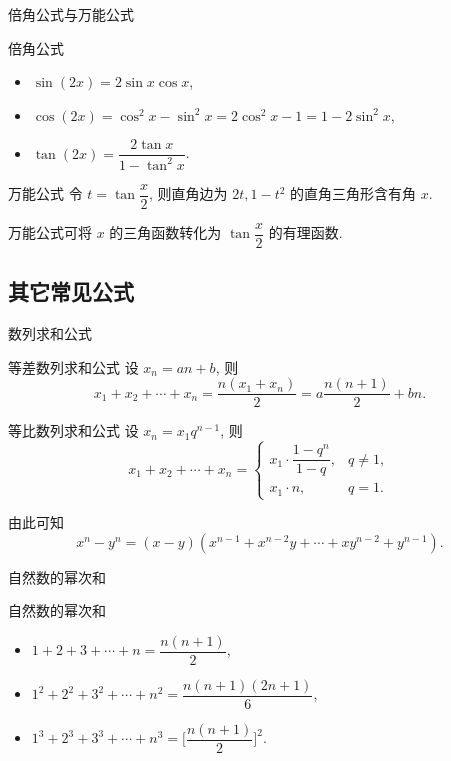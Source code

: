 \begin{frame}{倍角公式与万能公式}
	\onslide<+->
	\begin{main}{倍角公式}
		\begin{itemize}
			\item $\sin(2x)=2\sin x\cos x$,
			\item $\cos(2x)=\cos^2x-\sin^2x=2\cos^2x-1=1-2\sin^2x$,
			\item $\tan(2x)=\dfrac{2\tan x}{1-\tan^2x}$.
		\end{itemize}
	\end{main}
	\onslide<+->
	\begin{main}{万能公式}
		令 $t=\tan\dfrac x2$, 则直角边为 $2t,1-t^2$ 的直角三角形含有角 $x$.
		\onslide<+->{由于斜边是 $1+t^2$, 因此
		\[\sin x=\frac{2t}{1+t^2},\quad
			\cos x=\frac{1-t^2}{1+t^2},\quad
			\tan x=\frac{2t}{1-t^2}.\]}
	\end{main}
	\onslide<+->
	万能公式可将 $x$ 的三角函数转化为 $\tan \dfrac x2$ 的有理函数.
\end{frame}

\subsection{其它常见公式}

\begin{frame}{数列求和公式}
	\onslide<+->
	\begin{main}{等差数列求和公式}
		设 $x_n=an+b$, 则
		\[x_1+x_2+\cdots+x_n=\frac{n(x_1+x_n)}2=a\frac{n(n+1)}2+bn.\]
	\end{main}
	\onslide<+->
	\begin{main}{等比数列求和公式}
		设 $x_n=x_1 q^{n-1}$, 则
		\[x_1+x_2+\cdots+x_n=\begin{cases}
			x_1\cdot\dfrac{1-q^n}{1-q},& q\neq 1,\\
			x_1\cdot n, & q=1.
		\end{cases}\]
	\end{main}
	\onslide<+->
	由此可知
	\[x^n-y^n=(x-y)(x^{n-1}+x^{n-2}y+\cdots+xy^{n-2}+y^{n-1}).\]
\end{frame}


\begin{frame}{自然数的幂次和}
	\onslide<+->
	\begin{main}{自然数的幂次和}
		\begin{itemize}
			\item $1+2+3+\cdots+n=\dfrac{n(n+1)}2$,
			\item $1^2+2^2+3^2+\cdots+n^2=\dfrac{n(n+1)(2n+1)}6$,
			\item $1^3+2^3+3^3+\cdots+n^3=\biggl[\dfrac{n(n+1)}2\biggr]^2$.
		\end{itemize}
	\end{main}
\end{frame}


